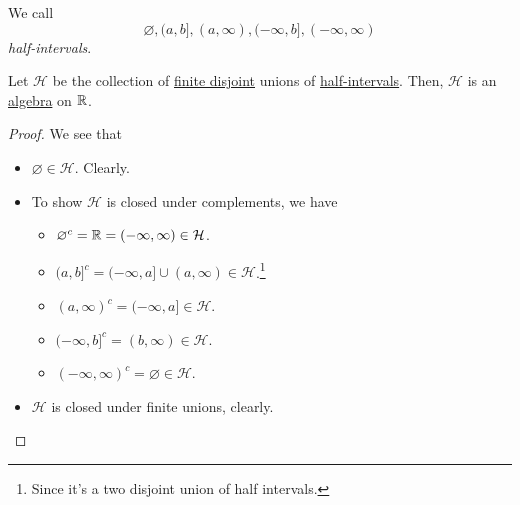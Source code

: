 \begin{definition}\label{def:half-intervals}
	We call
	\[
		\varnothing , (a, b], (a, \infty ), (-\infty , b], (-\infty , \infty )
	\]
	\emph{half-intervals}.
\end{definition}

\begin{lemma}
	Let \(\mathcal{H} \) be the collection of \underline{finite disjoint} unions of \hyperref[def:half-intervals]{half-intervals}. Then, \(\mathcal{H} \)
	is an \hyperref[def:algebra]{algebra} on \(\mathbb{\MakeUppercase{R}} \).
\end{lemma}
\begin{proof}
	We see that
	\begin{itemize}
		\item \(\varnothing \in \mathcal{H} \). Clearly.
		\item To show \(\mathcal{H} \) is closed under complements, we have
		      \begin{itemize}
			      \item \(\varnothing ^{c} = \mathbb{\MakeUppercase{r}} = (-\infty , \infty )\in \mathcal{H}\).
			      \item \((a, b]^{c} = (-\infty , a] \cup (a, \infty )\in\mathcal{H} \).\footnote{Since it's a two disjoint union of half intervals.}
			      \item \((a, \infty )^{c} = (-\infty , a]\in\mathcal{H}\).
			      \item \((-\infty , b]^{c} = (b, \infty )\in\mathcal{H} \).
			      \item \((-\infty , \infty )^{c} = \varnothing \in\mathcal{H}\).
		      \end{itemize}
		\item \(\mathcal{H} \) is closed under finite unions, clearly.
	\end{itemize}
\end{proof}

